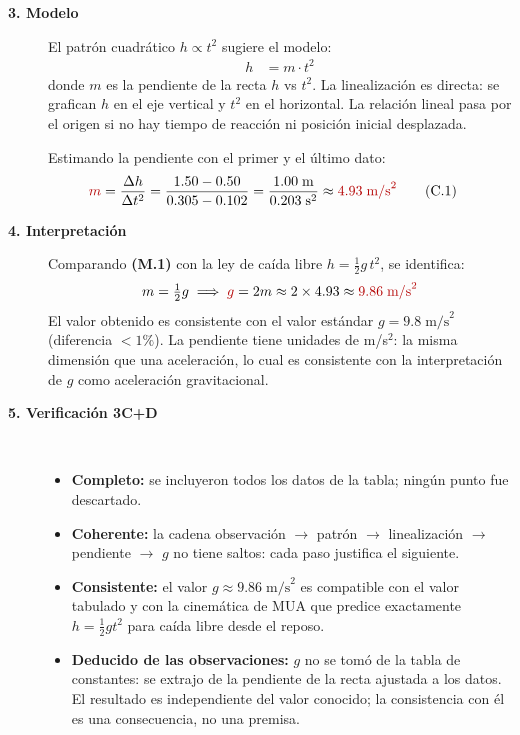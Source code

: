 \documentclass[11pt]{book}
\newcommand{\incog}[1]{\textcolor{colIncog}{#1}}
\begin{document}
\begin{enumerate}
\begin{description}
\begin{description}
    \item[\textbf{3. Modelo}]
    El patrón cuadrático $h \propto t^2$ sugiere el modelo:
    \begin{align}
        h &= m \cdot t^2 \tag{M.1}
    \end{align}
    donde $m$ es la pendiente de la recta $h$ vs $t^2$. La linealización es directa: se grafican $h$ en el eje vertical y $t^2$ en el horizontal. La relación lineal pasa por el origen si no hay tiempo de reacción ni posición inicial desplazada.

    Estimando la pendiente con el primer y el último dato:
    \begin{align}
        \incog{m} &= \frac{\Delta h}{\Delta t^2} = \frac{1.50 - 0.50}{0.305 - 0.102} = \frac{1.00\;\text{m}}{0.203\;\text{s}^2} \approx \incog{4.93\;\text{m/s}^2} \tag{C.1}
    \end{align}

    \item[\textbf{4. Interpretación}]
    Comparando \textbf{(M.1)} con la ley de caída libre $h = \tfrac{1}{2}g\,t^2$, se identifica:
    \[
        m = \tfrac{1}{2}g \implies \incog{g} = 2m \approx 2 \times 4.93 \approx \incog{9.86\;\text{m/s}^2}
    \]
    El valor obtenido es consistente con el valor estándar $g = 9.8\;\text{m/s}^2$ (diferencia $< 1\%$). La pendiente tiene unidades de m/s$^2$: la misma dimensión que una aceleración, lo cual es consistente con la interpretación de $g$ como aceleración gravitacional.

    \item[\textbf{5. Verificación 3C+D}]~
    \begin{itemize}
        \item {\bf Completo:} se incluyeron todos los datos de la tabla; ningún punto fue descartado.
        \item {\bf Coherente:} la cadena observación $\to$ patrón $\to$ linealización $\to$ pendiente $\to$ $g$ no tiene saltos: cada paso justifica el siguiente.
        \item {\bf Consistente:} el valor $g \approx 9.86\;\text{m/s}^2$ es compatible con el valor tabulado y con la cinemática de MUA que predice exactamente $h = \tfrac{1}{2}g t^2$ para caída libre desde el reposo.
        \item {\bf Deducido de las observaciones:} $g$ no se tomó de la tabla de constantes: se extrajo de la pendiente de la recta ajustada a los datos. El resultado es independiente del valor conocido; la consistencia con él es una consecuencia, no una premisa.
    \end{itemize}
\end{description}


\end{description}
\end{enumerate}
\end{document}
